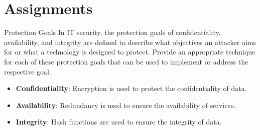 \documentclass{article}
\author{Leopold Lemmermann}
\begin{document}
\createtitle

\section{Assignments}
\begin{exercise}{Protection Goals}
  In IT security, the protection goals of confidentiality, availability, and integrity are defined to describe what objectives an attacker aims for or what a technology is designed to protect. Provide an appropriate technique for each of these protection goals that can be used to implement or address the respective goal.

  \begin{solution}
    \begin{itemize}
      \item \textbf{Confidentiality}: Encryption is used to protect the confidentiality of data.
      \item \textbf{Availability}: Redundancy is used to ensure the availability of services.
      \item \textbf{Integrity}: Hash functions are used to ensure the integrity of data.
    \end{itemize}
  \end{solution}
\end{exercise}
\end{document}
